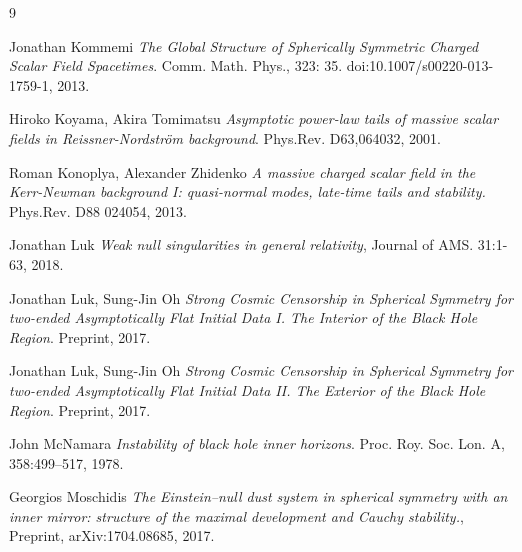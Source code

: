 \documentclass[10pt,a4paper]{article}
\theoremstyle{plain}
\theoremstyle{remark}
\theoremstyle{definition}
\theoremstyle{plain}
\theoremstyle{remark}
\theoremstyle{definition}
\numberwithin{equation}{section}
\begin{document}
\begin{thebibliography}{9}
	
	
	
	Jonathan Kommemi \emph{The Global Structure of Spherically Symmetric Charged Scalar Field Spacetimes}.
	Comm. Math. Phys., 323: 35. doi:10.1007/s00220-013-1759-1, 2013.
	
	
	
	
	
	
	
	
	
	
	
	
	
	
	Hiroko Koyama, Akira Tomimatsu \emph{Asymptotic power-law tails of massive scalar fields in Reissner-Nordström background}.
	Phys.Rev. D63,064032, 2001.
	
	
	
	
	Roman Konoplya, Alexander Zhidenko \emph{A massive charged scalar field in the Kerr-Newman background I: quasi-normal modes, late-time tails and stability.} Phys.Rev. D88 024054, 2013.
	
	
	
	
	
	
	
	
	Jonathan Luk
	\emph{Weak null singularities in general relativity}, Journal of AMS. 31:1-63, 2018.
	
	
	
	
	
	Jonathan Luk, Sung-Jin Oh
	\emph{Strong Cosmic Censorship in Spherical Symmetry for two-ended Asymptotically Flat Initial Data I. The Interior of the Black Hole Region}. Preprint, 2017.
	
	Jonathan Luk, Sung-Jin Oh
	\emph{Strong Cosmic Censorship in Spherical Symmetry for two-ended Asymptotically Flat Initial Data II. The Exterior of the Black Hole Region}. Preprint, 2017.
	
	John McNamara
	\emph{Instability of black hole inner horizons}. Proc. Roy. Soc. Lon. A, 358:499–517, 1978.
	
	
	
	
	
	
	
	
	 Georgios Moschidis 	\emph{The Einstein--null dust system in spherical symmetry with an inner mirror: structure of the maximal development and Cauchy stability.}, Preprint, arXiv:1704.08685, 2017.
	

\end{thebibliography}
\end{document}
